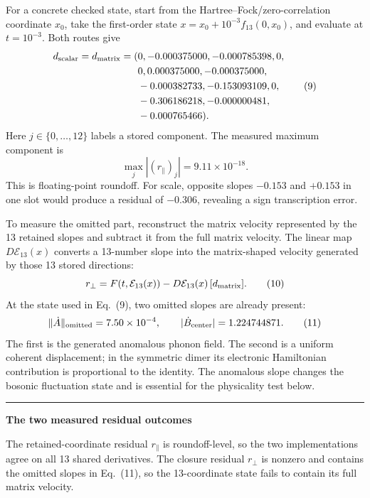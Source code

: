\documentclass[10pt,letterpaper,twocolumn]{article}
\newcommand{\tracebox}[3]{%
  \par\smallskip
  \noindent\begin{minipage}{\columnwidth}
    {\color{#1}\rule{\columnwidth}{1.1pt}}\par\vspace{-1pt}
    \small\textbf{\color{#1}#3}\par\smallskip\color{black}
}
\newcommand{\closetracebox}{%
  \par\vspace{1pt}{\color{navy!35}\rule{\columnwidth}{0.35pt}}
  \end{minipage}\par\smallskip
}
\begin{document}
{For a concrete checked state, start from the Hartree--Fock/zero-correlation
coordinate \(x_0\), take the first-order state
\(x=x_0+10^{-3}f_{13}(0,x_0)\), and evaluate at \(t=10^{-3}\).  Both routes
give
{\footnotesize
\[
\begin{aligned}
d_{\rm scalar}=d_{\rm matrix}=(&0,-0.000375000,
-0.000785398,0,\\
&0,0.000375000,-0.000375000,\\
&-0.000382733,-0.153093109,0,\\
&-0.306186218,-0.000000481,\\
&-0.000765466).
\end{aligned}
\tag{9}
\]
}
Here \(j\in\{0,\ldots,12\}\) labels a stored component.  The measured maximum
component is
\[
\max_j |(r_{\parallel})_j|=9.11\times10^{-18}.
\]
This is floating-point roundoff.  For scale, opposite slopes \(-0.153\) and
\(+0.153\) in one slot would produce a residual of \(-0.306\), revealing a
sign transcription error.

To measure the omitted part, reconstruct the matrix velocity represented by
the 13 retained slopes and subtract it from the full matrix velocity.  The
linear map \(D\mathcal E_{13}(x)\) converts a 13-number slope into the
matrix-shaped velocity generated by those 13 stored directions:
\[
r_{\perp}
=F(t,\mathcal E_{13}(x))
-D\mathcal E_{13}(x)\,[d_{\rm matrix}].
\tag{10}
\]
At the state used in Eq.~(9), two omitted slopes are already present:
\[
\lVert\dot A\rVert_{\rm omitted}=7.50\times10^{-4},
\qquad
|\dot B_{\rm center}|=1.224744871.
\tag{11}
\]
The first is the generated anomalous phonon field.  The second is a uniform
coherent displacement; in the symmetric dimer its electronic Hamiltonian
contribution is proportional to the identity.  The anomalous slope changes
the bosonic fluctuation state and is essential for the physicality test below.

\tracebox{navy}{paleblue}{The two measured residual outcomes}
The retained-coordinate residual \(r_{\parallel}\) is roundoff-level, so the
two implementations agree on all 13 shared derivatives.  The closure residual
\(r_{\perp}\) is nonzero and contains the omitted slopes in Eq.~(11), so the
13-coordinate state fails to contain its full matrix velocity.
\closetracebox

\begin{center}
\end{center}

}
\end{document}
